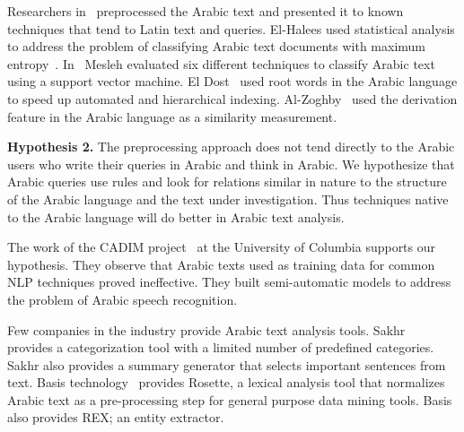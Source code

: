 \documentclass[12pt]{article}
\newcommand{\noTrRL}[1]{\transfalse\RL{#1}\transtrue}
\begin{document}
Researchers in~\cite{AEL07,Ham07,Abd07,MEl03} 
preprocessed the Arabic text and presented it to known 
techniques that tend to Latin text and queries.
El-Halees used statistical analysis to address the problem of 
classifying Arabic text documents with maximum 
entropy~\cite{AEL07}.
In~\cite{Abd07} Mesleh evaluated six different techniques to 
classify Arabic text using a support vector machine.
El Dost~\cite{MEl03} used root words in the Arabic language to 
speed up automated and hierarchical indexing.
Al-Zoghby~\cite{Ham07}
used the derivation feature in 
the Arabic language as a similarity measurement.

{\bf Hypothesis 2.} 
The preprocessing approach does not tend directly to 
the Arabic users who write their 
queries in Arabic and think in Arabic.
We hypothesize that Arabic queries use rules and 
look for relations similar in nature to the structure of the Arabic language 
and the text under investigation.
Thus techniques native to the Arabic language will do better 
in Arabic text analysis.

The work of the CADIM \noTrRL{q-adim} 
project~\cite{Col09} at the University of Columbia supports our 
hypothesis. They observe that Arabic texts used as training 
data for common NLP techniques proved ineffective. 
They built semi-automatic models to address the problem of
Arabic speech recognition.


Few companies in the industry provide Arabic text 
analysis tools.
Sakhr~\cite{Sak09} provides a categorization 
tool with a limited number of predefined categories.
Sakhr also provides a summary 
generator that selects important sentences from text.
Basis technology~\cite{Bas09} provides Rosette, a lexical 
analysis tool that normalizes Arabic text as a pre-processing step 
for general purpose data mining 
tools.  Basis also provides REX; an entity extractor.
\end{document}
